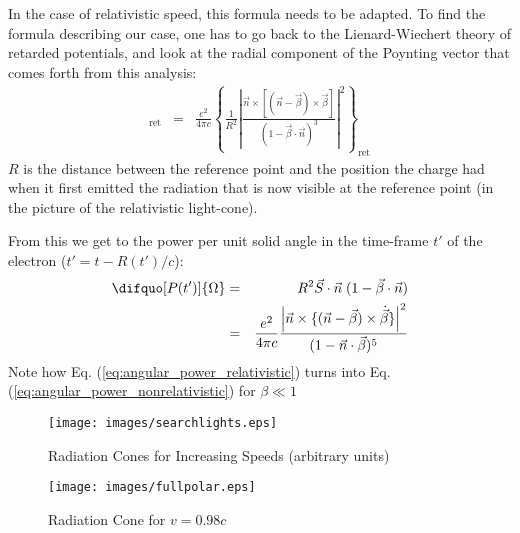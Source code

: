 \documentclass[a4paper,10pt]{article}
\begin{document}
    In the case of relativistic speed, this formula needs to be adapted. To
find the formula describing our case, one has to go back to the Lienard-Wiechert
theory of retarded potentials, and look at the radial component of the Poynting
vector that comes forth from this analysis:
\begin{eqnarray}
  [\vec{S} \cdot \vec{n}]_{\text{ret}}
  &=& 
  \frac{e^2}{4 \pi c}
    \left\{
       \frac{1}{R^2} \left|
         \frac{
             \vec{n} \times [  (\vec{n} - \vec{\beta}) \times
             \dot{\vec{\beta}}  ]
            }
            {
             (1-\vec{\beta}\cdot \vec{n})^3 
            }
       \right|^2
   \right\}_{\text{ret}}\label{eq:poynting_nonrelativistic}
\end{eqnarray}
$R$ is the distance between the reference point and the position the charge had
when it first emitted the radiation that is now visible at the reference
point (in the picture of the relativistic light-cone).

    From this we get to the power per unit solid angle in the time-frame $t'$ of
the electron ($t' = t - R(t')/c$):
\begin{eqnarray}
  \difquo[P(t')]{\Omega}  
    &=& R^2 \vec{S} \cdot \vec{n} \;  (1-\vec{\beta}\cdot\vec{n}) \\
    &=& \frac{e^2}{4 \pi c}
        \frac
           {\left| \vec{n} \times 
            \{ 
              (\vec{n} - \vec{\beta}) \times \dot{\vec{\beta}} 
            \} \right|^2
           }
           {
             (1- \vec{n} \cdot \vec{\beta})^5
           } \label{eq:angular_power_relativistic}
\end{eqnarray}
Note how Eq. (\ref{eq:angular_power_relativistic}) turns into Eq.
(\ref{eq:angular_power_nonrelativistic}) for $\beta \ll 1$

\begin{figure}[p]
    \centering
    \texttt{[image: images/searchlights.eps]}
    \caption{Radiation Cones for Increasing Speeds (arbitrary units)}
  \label{image:searchlight}
\end{figure}

\begin{figure}[p]
    \centering
    \texttt{[image: images/fullpolar.eps]}
    \caption{Radiation Cone for $v=0.98c$}
  \label{image:fullpolar}
\end{figure}
\end{document}

